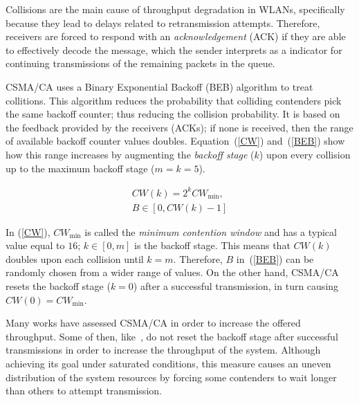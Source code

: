 Collisions are the main cause of throughput degradation in WLANs, specifically because they lead to delays related to retransmission attempts. Therefore, receivers are forced to respond with an \emph{acknowledgement} (ACK) if they are able to effectively decode the message, which the sender interprets as a indicator for continuing transmissions of the remaining packets in the queue. 


CSMA/CA uses a Binary Exponential Backoff (BEB) algorithm to treat collitions. This algorithm reduces the probability that colliding contenders pick the same backoff counter; thus reducing the collision probability. It is based on the feedback provided by the receivers (ACKs); if none is received, then the range of available backoff counter values doubles. Equation~(\ref{CW}) and~(\ref{BEB}) show how this range increases by augmenting the \emph{backoff stage} ($k$) upon every collision up to the maximum backoff stage ($m=k=5$).


\begin{subequations}
\begin{align}
	CW(k)= 2^{k}CW_{\min},\label{CW}\\
	B\in[0,CW(k)-1]\label{BEB}
\end{align}
\end{subequations}

In (\ref{CW}), $CW_{\min}$ is called the \emph{minimum contention window} and has a typical value equal to $16$; $k\in[0,m]$ is the backoff stage. This means that $CW(k)$ doubles upon each collision until $k=m$. Therefore, $B$ in~(\ref{BEB}) can be randomly chosen from a wider range of values. On the other hand, CSMA/CA resets the backoff stage ($k=0$) after a successful transmission, in turn causing $CW(0)=CW_{\min}$.

Many works have assessed CSMA/CA in order to increase the offered throughput. Some of then, like~\cite{bharghavan1994map,wang2004ncr}, do not reset the backoff stage after successful transmissions in order to increase the throughput of the system. Although achieving its goal under saturated conditions, this measure causes an uneven distribution of the system resources by forcing some contenders to wait longer than others to attempt transmission.

